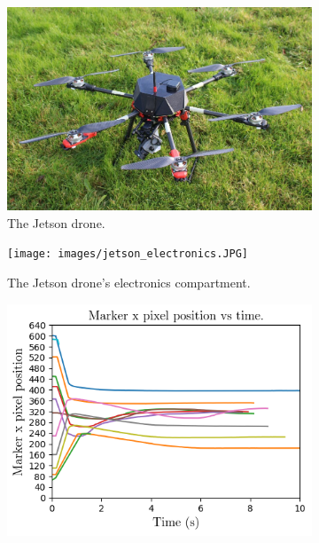 \begin{figure}
    \centering
        \begin{subfigure}[b]{0.48\textwidth}
        \centering
        \includegraphics[width=\textwidth]{images/jetson_drone.JPG}
        \caption{The Jetson drone.}
        \label{figure:jetson_drone_external}
    \end{subfigure}
        \begin{subfigure}[b]{0.48\textwidth}
        \centering
        \texttt{[image: images/jetson\_electronics.JPG]}
        \caption{The Jetson drone's electronics compartment.}
        \label{figure:jetson_electronics}
    \end{subfigure}
    \begin{subfigure}[b]{0.49\textwidth}
        \centering
        \includegraphics[width=\textwidth]{images/jetson_gimbal_performance_x_axis.png}

\end{subfigure}
\end{figure}
